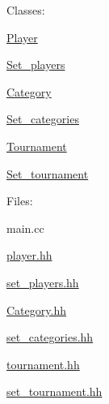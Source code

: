 Classes\+: 
\begin{DoxyItemize}
\item \mbox{\hyperlink{class_player}{Player}} 
\item \mbox{\hyperlink{class_set__players}{Set\+\_\+players}} 
\item \mbox{\hyperlink{class_category}{Category}} 
\item \mbox{\hyperlink{class_set__categories}{Set\+\_\+categories}} 
\item \mbox{\hyperlink{class_tournament}{Tournament}} 
\item \mbox{\hyperlink{class_set__tournament}{Set\+\_\+tournament}} 
\end{DoxyItemize}

Files\+: 
\begin{DoxyItemize}
\item main.\+cc 
\item \mbox{\hyperlink{player_8hh}{player.\+hh}} 
\item \mbox{\hyperlink{set__players_8hh}{set\+\_\+players.\+hh}} 
\item \mbox{\hyperlink{category_8hh}{Category.\+hh}} 
\item \mbox{\hyperlink{set__categories_8hh}{set\+\_\+categories.\+hh}} 
\item \mbox{\hyperlink{tournament_8hh}{tournament.\+hh}} 
\item \mbox{\hyperlink{set__tournament_8hh}{set\+\_\+tournament.\+hh}} 
\end{DoxyItemize}